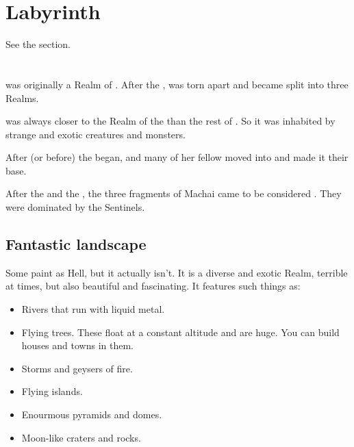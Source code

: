 \section{Labyrinth}
See the  section.















\section{\Machai}
\index{\Machai}
\Machai was originally a Realm of \Miith. 
After the , \Machai was torn apart and became split into three Realms. 

\Machai was always closer to the Realm of the \xss than the rest of \Miith. 
So it was inhabited by strange and exotic creatures and monsters. 

After (or before) the  began, \Tiamat and many of her fellow \dragons moved into \Machai and made it their base. 

After the \secondbanewar and the \Shrouding, the three fragments of Machai came to be considered . 
They were dominated by the Sentinels. 









\subsection{Fantastic landscape}
Some  paint \Machai{} as Hell, but it actually isn't. 
It is a diverse and exotic Realm, terrible at times, but also beautiful and fascinating. 
It features such things as:

\begin{itemize}
  \item Rivers that run with liquid metal.
  \item Flying trees. These float at a constant altitude and are huge. You can build houses and towns in them. 
  \item Storms and geysers of fire. 
  \item Flying islands.
  \item Enourmous pyramids and domes. 
  \item Moon-like craters and rocks.
\end{itemize}

